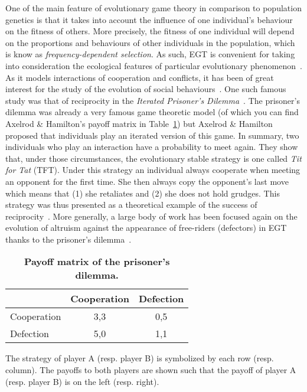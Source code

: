     One of the main feature of evolutionary game theory in comparison to population genetics is that it takes into account the influence of one individual's behaviour on the fitness of others. More precisely, the fitness of one individual will depend on the proportions and behaviours of other individuals in the population, which is know as \emph{frequency-dependent selection}. As such, EGT is convenient for taking into consideration the ecological features of particular evolutionary phenomenon~\parencite{Hammerstein1994}. As it models interactions of cooperation and conflicts, it has been of great interest for the study of the evolution of social behaviours~\parencite{Bshary2015}. One such famous study was that of reciprocity in the \emph{Iterated Prisoner's Dilemma}~\parencite{Axelrod1984}. The prisoner's dilemma was already a very famous game theoretic model (of which you can find Axelrod \& Hamilton's payoff matrix in Table~\ref{table:payoffIPD}) but Axelrod \& Hamilton proposed that individuals play an iterated version of this game. In summary, two individuals who play an interaction have a probability to meet again. They show that, under those circumstances, the evolutionary stable strategy is one called \emph{Tit for Tat} (TFT). Under this strategy an individual always cooperate when meeting an opponent for the first time. She then always copy the opponent's last move which means that (1) she retaliates and (2) she does not hold grudges. This strategy was thus presented as a theoretical example of the success of reciprocity~\parencite{Trivers1971}. More generally, a large body of work has been focused again on the evolution of altruism against the appearance of free-riders (defectors) in EGT thanks to the prisoner's dilemma~\parencite{Requejo2013a}.


    \begin{table}[ht]
    \centering
      \caption{\textbf{Payoff matrix of the prisoner's dilemma.}}
      \begin{tabular}{l|c|c}
        & Cooperation & Defection \\
        \hline
        Cooperation & 3,3 & 0,5 \\
        \hline
        Defection & 5,0 & 1,1 \\
        \hline
      \end{tabular}
      \begin{flushleft} The strategy of player A (resp. player B) is symbolized by each row (resp. column). The payoffs to both players are shown such that the payoff of player A (resp. player B) is on the left (resp. right). 
      \end{flushleft}
    \label{table:payoffIPD}
    \end{table}


